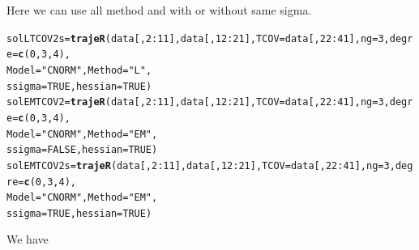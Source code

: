 \documentclass{article}\usepackage[]{graphicx}\usepackage[]{color}
\makeatletter
\newcommand{\hlnum}[1]{\textcolor[rgb]{0.686,0.059,0.569}{#1}}%
\newcommand{\hlstr}[1]{\textcolor[rgb]{0.192,0.494,0.8}{#1}}%
\newcommand{\hlopt}[1]{\textcolor[rgb]{0,0,0}{#1}}%
\newcommand{\hlstd}[1]{\textcolor[rgb]{0.345,0.345,0.345}{#1}}%
\newcommand{\hlkwb}[1]{\textcolor[rgb]{0.69,0.353,0.396}{#1}}%
\newcommand{\hlkwc}[1]{\textcolor[rgb]{0.333,0.667,0.333}{#1}}%
\newcommand{\hlkwd}[1]{\textcolor[rgb]{0.737,0.353,0.396}{\textbf{#1}}}%
\newenvironment{kframe}{%
 \def\at@end@of@kframe{}%
 \ifinner\ifhmode%
  \def\at@end@of@kframe{\end{minipage}}%
  \begin{minipage}{\columnwidth}%
 \fi\fi%
 \def\FrameCommand##1{\hskip\@totalleftmargin \hskip-\fboxsep
 \colorbox{shadecolor}{##1}\hskip-\fboxsep
     \hskip-\linewidth \hskip-\@totalleftmargin \hskip\columnwidth}%
 \MakeFramed {\advance\hsize-\width
   \@totalleftmargin\z@ \linewidth\hsize
   \@setminipage}}%
 {\par\unskip\endMakeFramed%
 \at@end@of@kframe}
\newenvironment{knitrout}{}{} %
\makeatother
\begin{document}
Here we can use all method and with or without same sigma.
\begin{knitrout}
\color{fgcolor}\begin{kframe}
\begin{alltt}
\hlstd{solLTCOV2s} \hlkwb{=} \hlkwd{trajeR}\hlstd{(data[,}\hlnum{2}\hlopt{:}\hlnum{11}\hlstd{], data[,}\hlnum{12}\hlopt{:}\hlnum{21}\hlstd{],} \hlkwc{TCOV} \hlstd{= data[,}\hlnum{22}\hlopt{:}\hlnum{41}\hlstd{],} \hlkwc{ng} \hlstd{=} \hlnum{3}\hlstd{,} \hlkwc{degre}\hlstd{=}\hlkwd{c}\hlstd{(}\hlnum{0}\hlstd{,}\hlnum{3}\hlstd{,}\hlnum{4}\hlstd{),}
                   \hlkwc{Model}\hlstd{=}\hlstr{"CNORM"}\hlstd{,} \hlkwc{Method} \hlstd{=} \hlstr{"L"}\hlstd{,}
                   \hlkwc{ssigma} \hlstd{=} \hlnum{TRUE}\hlstd{,} \hlkwc{hessian} \hlstd{=} \hlnum{TRUE}\hlstd{)}
\hlstd{solEMTCOV2} \hlkwb{=} \hlkwd{trajeR}\hlstd{(data[,}\hlnum{2}\hlopt{:}\hlnum{11}\hlstd{], data[,}\hlnum{12}\hlopt{:}\hlnum{21}\hlstd{],} \hlkwc{TCOV} \hlstd{= data[,}\hlnum{22}\hlopt{:}\hlnum{41}\hlstd{],} \hlkwc{ng} \hlstd{=} \hlnum{3}\hlstd{,} \hlkwc{degre}\hlstd{=}\hlkwd{c}\hlstd{(}\hlnum{0}\hlstd{,}\hlnum{3}\hlstd{,}\hlnum{4}\hlstd{),}
                  \hlkwc{Model}\hlstd{=}\hlstr{"CNORM"}\hlstd{,} \hlkwc{Method} \hlstd{=} \hlstr{"EM"}\hlstd{,}
                  \hlkwc{ssigma} \hlstd{=} \hlnum{FALSE}\hlstd{,} \hlkwc{hessian} \hlstd{=} \hlnum{TRUE}\hlstd{)}
\hlstd{solEMTCOV2s} \hlkwb{=} \hlkwd{trajeR}\hlstd{(data[,}\hlnum{2}\hlopt{:}\hlnum{11}\hlstd{], data[,}\hlnum{12}\hlopt{:}\hlnum{21}\hlstd{],} \hlkwc{TCOV} \hlstd{= data[,}\hlnum{22}\hlopt{:}\hlnum{41}\hlstd{],} \hlkwc{ng} \hlstd{=} \hlnum{3}\hlstd{,} \hlkwc{degre}\hlstd{=}\hlkwd{c}\hlstd{(}\hlnum{0}\hlstd{,}\hlnum{3}\hlstd{,}\hlnum{4}\hlstd{),}
                  \hlkwc{Model}\hlstd{=}\hlstr{"CNORM"}\hlstd{,} \hlkwc{Method} \hlstd{=} \hlstr{"EM"}\hlstd{,}
                  \hlkwc{ssigma} \hlstd{=} \hlnum{TRUE}\hlstd{,} \hlkwc{hessian} \hlstd{=} \hlnum{TRUE}\hlstd{)}
\end{alltt}
\end{kframe}
\end{knitrout}
We have
\end{document}
